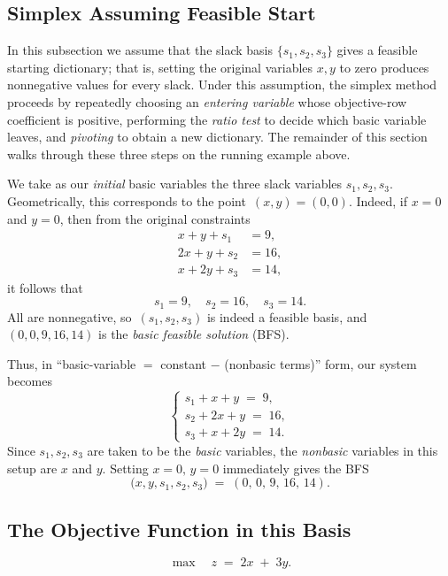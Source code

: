  

\subsection{Simplex Assuming Feasible Start}

In this subsection we assume that the slack basis \(\{s_1, s_2, s_3\}\) gives a
feasible starting dictionary; that is, setting the original variables
\(x,y\) to zero produces nonnegative values for every slack.  Under this
assumption, the simplex method proceeds by repeatedly choosing an
\emph{entering variable} whose objective-row coefficient is positive,
performing the \emph{ratio test} to decide which basic variable leaves, and
\emph{pivoting} to obtain a new dictionary.  The remainder of this section
walks through these three steps on the running example above.

We take as our \emph{initial} basic variables the three slack variables \(s_1, s_2, s_3\).  Geometrically, this corresponds to the point \(\,(x,y)=(0,0)\).  Indeed, if \(x=0\) and \(y=0\), then from the original constraints
\[
\begin{aligned}
  x + y + s_1 &= 9,\\
  2x + y + s_2 &= 16,\\
  x + 2y + s_3 &= 14,
\end{aligned}
\]
it follows that
\[
s_1 = 9,
\quad
s_2 = 16,
\quad
s_3 = 14.
\]
All are nonnegative, so \(\,(s_1,s_2,s_3)\) is indeed a feasible basis, and \((0,0,9,16,14)\) is the \emph{basic feasible solution} (BFS).

Thus, in ``basic-variable \(=\) constant \(-\) (nonbasic terms)'' form, our system becomes
\[
\begin{cases}
s_1 + x + y \;=\; 9,\\
s_2 + 2x + y \;=\; 16,\\
s_3 + x + 2y \;=\; 14.
\end{cases}
\]
Since \(s_1, s_2, s_3\) are taken to be the \emph{basic} variables, the \emph{nonbasic} variables in this setup are \(x\) and \(y\).  Setting \(x=0,\,y=0\) immediately gives the BFS
\[
\bigl(x,y,s_1,s_2,s_3\bigr)
\;=\;
(0,\,0,\,9,\,16,\,14).
\]

\subsection*{The Objective Function in this Basis}
%
\[
\max\quad z \;=\; 2x \;+\; 3y.
\]
%
%
%
